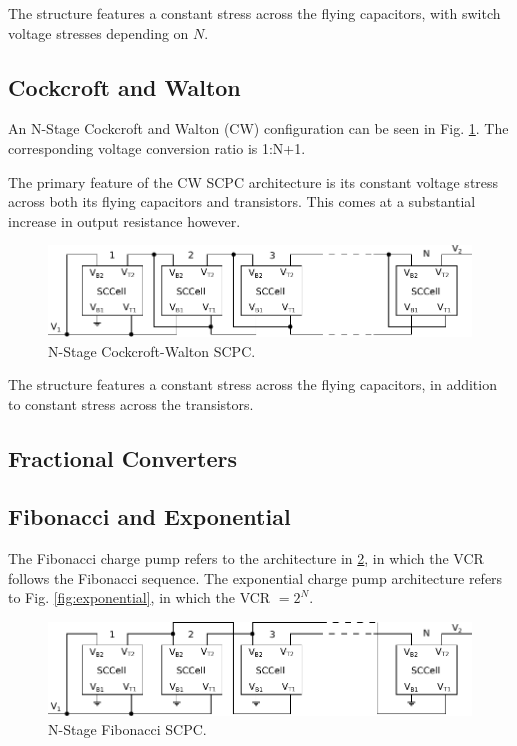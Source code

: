 	The structure features a constant stress across the flying capacitors, with switch voltage stresses depending on $N$.
	\subsection{Cockcroft and Walton}
	An N-Stage Cockcroft and Walton (CW) configuration can be seen in Fig. \ref{fig:cwalton}. The corresponding voltage conversion ratio is 1:N+1.
	
	The primary feature of the CW SCPC architecture is its constant voltage stress across both its flying capacitors and transistors. This comes at a substantial increase in output resistance however.
	
\begin{figure}
	\includegraphics[width=\linewidth]{4Terminal/Figures/CWalton.pdf}
	\caption{N-Stage Cockcroft-Walton SCPC.}
	\label{fig:cwalton}
\end{figure}
	
	The structure features a constant stress across the flying capacitors, in addition to constant stress across the transistors.
	
	\subsection{Fractional Converters}
	\subsection{Fibonacci and Exponential}
	The Fibonacci charge pump refers to the architecture in \ref{fig:fibonacci}, in which the VCR follows the Fibonacci sequence. The exponential charge pump architecture refers to Fig. \ref{fig:exponential}, in which the VCR $= 2^N$. 
	
	\begin{figure}
		\centering
		\includegraphics[width=\linewidth]{4Terminal/Figures/Fibonacci.pdf}
		\caption{N-Stage Fibonacci SCPC.}
		\label{fig:fibonacci}
	\end{figure}
	
